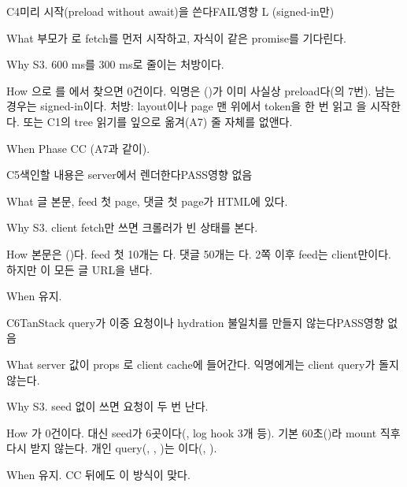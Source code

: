 \begin{checkitem}{\ckopen}{C4}{미리 시작(preload without await)을 쓴다}{FAIL\ckdot{}영향 L (signed-in만)}
  \item[What] 부모가 로 fetch를 먼저 시작하고, 자식이 같은 promise를 기다린다.
  \item[Why] S3. 600 ms를 300 ms로 줄이는 처방이다.
  \item[How] 으로 를 에서 찾으면 0건이다. 익명은 ()가 이미 사실상 preload다(의 7번). 남는 경우는 signed-in이다. 처방: layout이나 page 맨 위에서 token을 한 번 읽고 을 시작한다. 또는 C1의 tree 읽기를 잎으로 옮겨(A7) 줄 자체를 없앤다.
  \item[When] Phase CC (A7과 같이).
\end{checkitem}

\begin{checkitem}{\ckdone}{C5}{색인할 내용은 server에서 렌더한다}{PASS\ckdot{}영향 없음}
  \item[What] 글 본문, feed 첫 page, 댓글 첫 page가 HTML에 있다.
  \item[Why] S3. client fetch만 쓰면 크롤러가 빈 상태를 본다.
  \item[How] 본문은 ()다. feed 첫 10개는 다. 댓글 50개는 다. 2쪽 이후 feed는 client만이다. 하지만 이 모든 글 URL을 낸다.
  \item[When] 유지.
\end{checkitem}

\begin{checkitem}{\ckdone}{C6}{TanStack query가 이중 요청이나 hydration 불일치를 만들지 않는다}{PASS\ckdot{}영향 없음}
  \item[What] server 값이 props 로 client cache에 들어간다. 익명에게는 client query가 돌지 않는다.
  \item[Why] S3. seed 없이 쓰면 요청이 두 번 난다.
  \item[How] 가 0건이다. 대신  seed가 6곳이다(, log hook 3개 등). 기본  60초()라 mount 직후 다시 받지 않는다. 개인 query(, , )는 이다(, ).
  \item[When] 유지. CC 뒤에도 이 방식이 맞다.
\end{checkitem}

